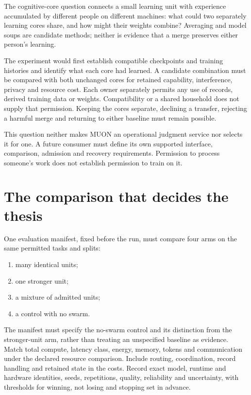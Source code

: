 The cognitive-core question connects a small learning unit with experience accumulated by different people on different machines: what could two separately learning cores share, and how might their weights combine? Averaging and model soups are candidate methods; neither is evidence that a merge preserves either person's learning.

The experiment would first establish compatible checkpoints and training histories and identify what each core had learned. A candidate combination must be compared with both unchanged cores for retained capability, interference, privacy and resource cost. Each owner separately permits any use of records, derived training data or weights. Compatibility or a shared household does not supply that permission. Keeping the cores separate, declining a transfer, rejecting a harmful merge and returning to either baseline must remain possible.

This question neither makes MUON an operational judgment service nor selects it for one. A future consumer must define its own supported interface, comparison, admission and recovery requirements. Permission to process someone's work does not establish permission to train on it.

\section{The comparison that decides the thesis}

One evaluation manifest, fixed before the run, must compare four arms on the same permitted tasks and splits:
\begin{enumerate}
\item many identical units;
\item one stronger unit;
\item a mixture of admitted units;
\item a control with no swarm.
\end{enumerate}

The manifest must specify the no-swarm control and its distinction from the stronger-unit arm, rather than treating an unspecified baseline as evidence. Match total compute, latency class, energy, memory, tokens and communication under the declared resource comparison. Include routing, coordination, record handling and retained state in the costs. Record exact model, runtime and hardware identities, seeds, repetitions, quality, reliability and uncertainty, with thresholds for winning, not losing and stopping set in advance.

